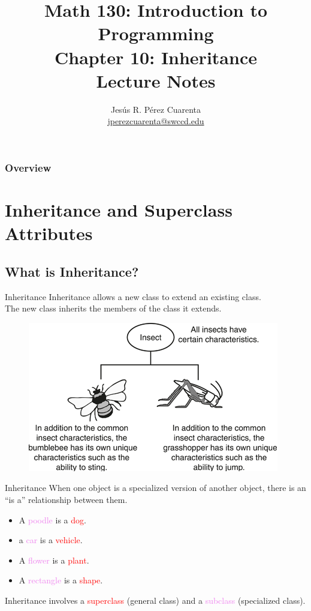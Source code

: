 \documentclass[11pt]{beamer}
\title[Chapter 10 Notes]{Math 130: Introduction to Programming \\ Chapter 10: Inheritance \\ Lecture Notes}
\author{Jesús R. Pérez Cuarenta \\
\href{mailto:jperezcuarenta@swccd.edu}{jperezcuarenta@swccd.edu}
}
\date{}
\newcommand{\red}[1]{\textcolor{red}{#1}}
\newcommand{\violet}[1]{\textcolor{violet}{#1}}
\begin{document}
\begin{frame}
  \maketitle
\end{frame}

\begin{frame}
\frametitle{Overview}
    \tableofcontents
\end{frame}

\section{Inheritance and Superclass Attributes}
\subsection{What is Inheritance?}
\begin{frame}{Inheritance}
    Inheritance allows a new class to extend an existing class. \\ \vspace{1em}
    The new class inherits the members of the class it extends.
    \noindent 
    \begin{figure}[H]
    \centering
    \includegraphics[scale=0.7]{Images/chapter10_section01_inheritInsects.png}
    \end{figure}
\end{frame}

\begin{frame}{Inheritance}
    When one object is a specialized version of another object, there is an ``is a'' relationship between them.
    \begin{itemize}
        \item A \violet{poodle} is a \red{dog}.
        \item a \violet{car} is a \red{vehicle}.
        \item A \violet{flower} is a \red{plant}.
        \item A \violet{rectangle} is a \red{shape}.
    \end{itemize}
    Inheritance involves a \red{superclass} (general class) and a \violet{subclass} (specialized class).
\end{frame}
\end{document}

